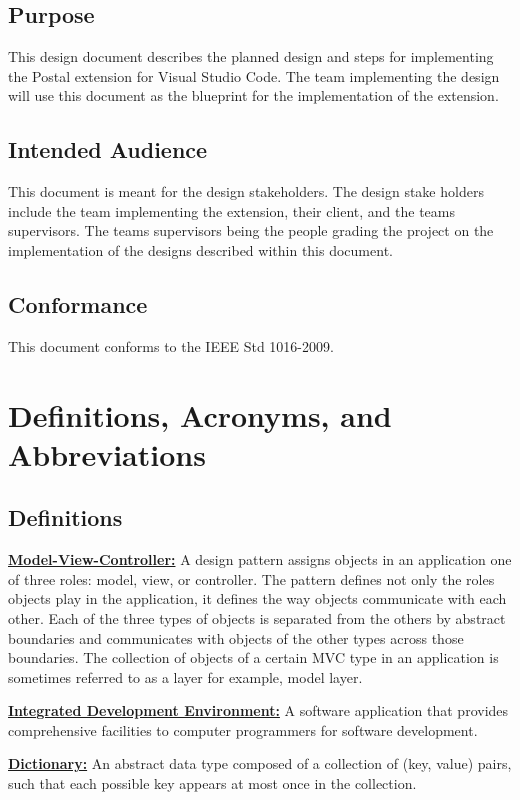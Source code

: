 \documentclass[letterpaper,10pt,titlepage,draftclsnofoot,onecolumn,onesided] {IEEEtran}
\begin{document}
\subsection{Purpose}
This design document describes the planned design and steps for implementing the Postal extension for Visual Studio Code. 
The team implementing the design will use this document as the blueprint for the implementation of the extension. 

\subsection{Intended Audience}
This document is meant for the design stakeholders. 
The design stake holders include the team implementing the extension, their client, and the teams supervisors. 
The teams supervisors being the people grading the project on the implementation of the designs described within this document.

\subsection{Conformance}
This document conforms to the IEEE Std 1016-2009.

\section{Definitions, Acronyms, and Abbreviations}

\subsection{Definitions}
\underline{\textbf{Model-View-Controller:}} A design pattern assigns objects in an application one of three roles: model, view, or controller. 
The pattern defines not only the roles objects play in the application, it defines the way objects communicate with each other. 
Each of the three types of objects is separated from the others by abstract boundaries and communicates with objects of the other types across those boundaries. 
The collection of objects of a certain MVC type in an application is sometimes referred to as a layer for example, model layer.\cite{appleMVC} 

\underline{\textbf{Integrated Development Environment:}} A software application that provides comprehensive facilities to computer programmers for software development. 

\underline{\textbf{Dictionary:}} An abstract data type composed of a collection of (key, value) pairs, such that each possible key appears at most once in the collection.
\end{document}
